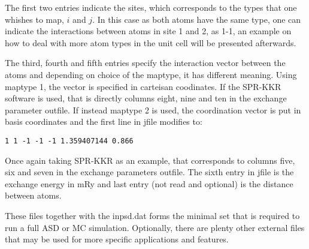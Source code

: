 \documentclass[11pt,fleqn,a4]{book} %
\newcommand{\rkeyword}[1]{\hyperref[#1]{\texttt{#1}}}
\newcommand{\rfilename}[1]{\hyperref[#1]{\texttt{#1}}}
\begin{document}
The first two entries indicate the sites, which corresponds to the types that one whishes to map, $i$ and $j$. In this case as both atoms have the same type, one can indicate the interactions between atoms in site 1 and 2, as 1-1, an example on how to deal with more atom types in the unit cell will be presented afterwards. 

The third, fourth and fifth entries specify the interaction  vector between the atoms and depending on choice of the maptype, it has different meaning.  Using maptype 1, the vector is specified in carteisan coodinates.  If the SPR-KKR software is used, that is directly columns eight, nine and ten in the exchange parameter outfile. 
If instead maptype 2 is used, the coordination vector is put in basis coordinates and the first line in jfile modifies to:

\begin{fBox} 
\begin{Verbatim}
1 1 -1 -1 -1 1.359407144 0.866
\end{Verbatim}
\end{fBox}

Once again taking SPR-KKR as an example, that corresponds to columns five, six and seven in the exchange parameters outfile.
The sixth entry in jfile is the exchange energy in mRy and last entry (not read and optional) is the distance between atoms.

These files together with the inpsd.dat forms the minimal set that is required to run a full ASD or MC simulation. Optionally, there are plenty other external files that may be used for more specific applications and features.  



\end{document}
